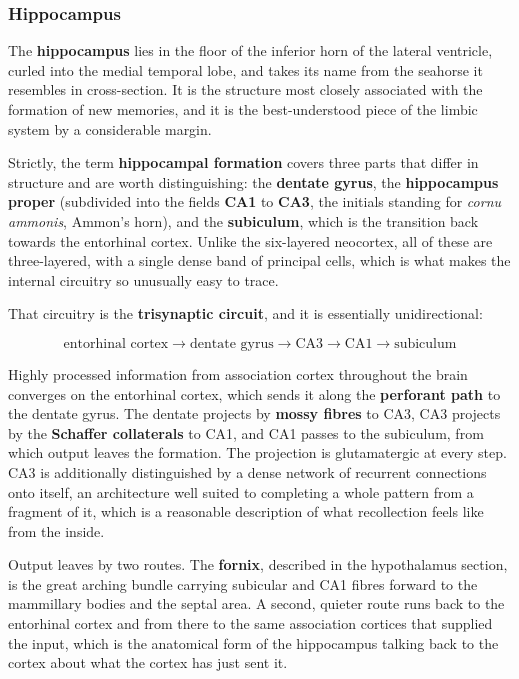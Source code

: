 \documentclass[11pt]{article}
\begin{document}
\subsubsection{Hippocampus}

The \textbf{hippocampus} lies in the floor of the inferior horn of the lateral ventricle, curled into the medial temporal lobe, and takes its name from the seahorse it resembles in cross-section. It is the structure most closely associated with the formation of new memories, and it is the best-understood piece of the limbic system by a considerable margin.

Strictly, the term \textbf{hippocampal formation} covers three parts that differ in structure and are worth distinguishing: the \textbf{dentate gyrus}, the \textbf{hippocampus proper} (subdivided into the fields \textbf{CA1} to \textbf{CA3}, the initials standing for \textit{cornu ammonis}, Ammon's horn), and the \textbf{subiculum}, which is the transition back towards the entorhinal cortex. Unlike the six-layered neocortex, all of these are three-layered, with a single dense band of principal cells, which is what makes the internal circuitry so unusually easy to trace.

That circuitry is the \textbf{trisynaptic circuit}, and it is essentially unidirectional:

\[
\text{entorhinal cortex} \rightarrow \text{dentate gyrus} \rightarrow \text{CA3} \rightarrow \text{CA1} \rightarrow \text{subiculum}
\]

Highly processed information from association cortex throughout the brain converges on the entorhinal cortex, which sends it along the \textbf{perforant path} to the dentate gyrus. The dentate projects by \textbf{mossy fibres} to CA3, CA3 projects by the \textbf{Schaffer collaterals} to CA1, and CA1 passes to the subiculum, from which output leaves the formation. The projection is glutamatergic at every step. CA3 is additionally distinguished by a dense network of recurrent connections onto itself, an architecture well suited to completing a whole pattern from a fragment of it, which is a reasonable description of what recollection feels like from the inside.

Output leaves by two routes. The \textbf{fornix}, described in the hypothalamus section, is the great arching bundle carrying subicular and CA1 fibres forward to the mammillary bodies and the septal area. A second, quieter route runs back to the entorhinal cortex and from there to the same association cortices that supplied the input, which is the anatomical form of the hippocampus talking back to the cortex about what the cortex has just sent it.
\end{document}
